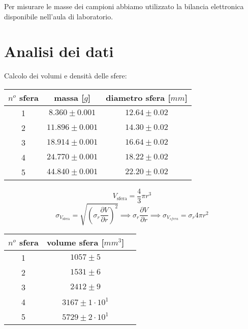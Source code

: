 \documentclass[8pt]{article}
\begin{document}
Per misurare le masse dei campioni abbiamo utilizzato la bilancia elettronica disponibile nell'aula
di laboratorio.

\section{Analisi dei dati}
Calcolo dei volumi e densità delle sfere:

\begin{center}
\begin{tabular}{ c c c }
\toprule
$n^o$ sfera & massa [$g$] & diametro sfera [$mm$] \\
\midrule
1 & $8.360 \pm 0.001$ & $12.64 \pm 0.02$ \\
2 & $11.896 \pm 0.001$ & $14.30 \pm 0.02$ \\
3 & $18.914 \pm 0.001$ & $16.64 \pm 0.02$ \\
4 & $24.770 \pm 0.001$ & $18.22 \pm 0.02$ \\
5 & $44.840 \pm 0.001$ & $22.20 \pm 0.02$ \\
\bottomrule
\end{tabular}
\end{center}

\bigskip

\begin{displaymath}
V_{\text{sfera}} = \frac{4}{3} \pi r^3
\end{displaymath}
\begin{displaymath}
\sigma_{V_{\text{sfera}}} = \sqrt{\left(\sigma_{r}\frac{\partial V}{\partial r}\right)^2} \implies \sigma_{r}\frac{\partial V}{\partial r} \implies \sigma_{V_{sfera}} = \sigma_{r} 4 \pi r^2
\end{displaymath}

\smallskip

\begin{center}
\begin{tabular}{ c c c }
\toprule
$n^o$ sfera & volume sfera [$mm^3$] \\
\midrule
1 & $1057 \pm 5$ \\
2 & $1531 \pm 6$ \\
3 & $2412 \pm 9$ \\
4 & $3167 \pm 1 \cdot 10^1$ \\
5 & $5729 \pm 2 \cdot 10^1$ \\
\bottomrule
\end{tabular}
\end{center} 

\bigskip
\end{document}
